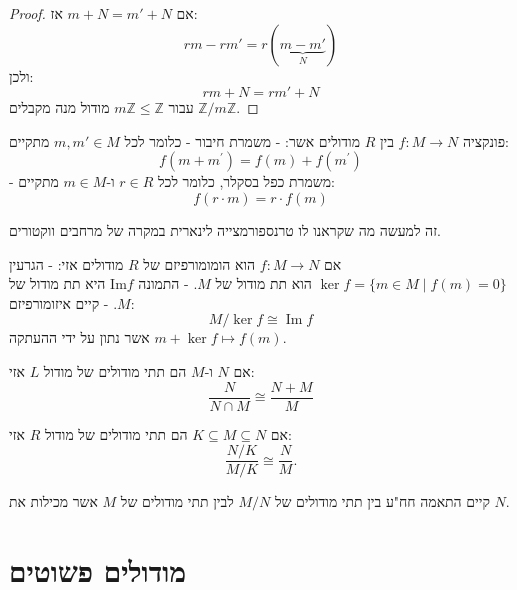 \documentclass{tstextbook}
\begin{document}
\begin{proof}
אם \(m+N=m'+N\) אז:
$$r m - r m' = r(\underbrace{ m - m' }_{ N })$$
ולכן:
$$r m +N= r m' +N$$
עבור \(m\mathbb{Z}\leq \mathbb{Z}\) מודול מנה מקבלים \(\mathbb{Z} / m\mathbb{Z}\).

\end{proof}
\begin{definition}
פונקציה \(f:M\to N\) בין \(R\) מודולים אשר:
- משמרת חיבור - כלומר לכל \(m,m' \in M\) מתקיים:
$$f(m+m^{\prime})=f(m)+f(m^{\prime})$$
- משמרת כפל בסקלר, כלומר לכל \(r \in R\) ו-\(m \in M\) מתקיים:
$$f(r\cdot m)=r\cdot f(m)$$

\end{definition}
\begin{remark}
זה למעשה מה שקראנו לו טרנספורמצייה לינארית במקרה של מרחבים ווקטורים.

\end{remark}
\begin{proposition}
אם \(f:M\to N\) הוא הומומורפיזם של \(R\) מודולים אזי:
- הגרעין \(\ker f = \{ m \in M\mid f(m)=0 \}\) הוא תת מודול של \(M\).
- התמונה \(\mathrm{Im}f\) היא תת מודול של \(M\).
- קיים איזומורפיזם:
$$M/\ker f\cong\operatorname{Im}f$$
אשר נתון על ידי ההעתקה \(m+\ker f\mapsto f(m)\).

\end{proposition}
\begin{proposition}
אם \(N\) ו-\(M\) הם תתי מודולים של מודול \(L\) אזי:
$$\frac{N}{N\cap M}\cong\frac{N+M}{M}$$

\end{proposition}
\begin{proposition}
אם \(K\subseteq M \subseteq N\) הם תתי מודולים של מודול \(R\) אזי:
$${\frac{N/K}{M/K}}\cong{\frac{N}{M}}.$$

\end{proposition}
\begin{proposition}
קיים התאמה חח"ע בין תתי מודולים של \(M / N\) לבין תתי מודולים של \(M\) אשר מכילות את \(N\).

\end{proposition}
\section{מודולים פשוטים}
\end{document}
